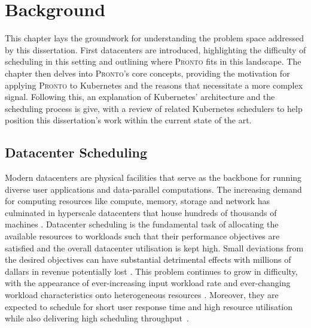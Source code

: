 \chapter{Background}

%
%
This chapter lays the groundwork for understanding the problem space addressed
by this dissertation. First datacenters are introduced, highlighting the
difficulty of scheduling in this setting and outlining where \textsc{Pronto}
fits in this landscape. The chapter then delves into \textsc{Pronto}'s core
concepts, providing the motivation for applying \textsc{Pronto} to Kubernetes
and the reasons that necessitate a more complex signal. Following this, an
explanation of Kubernetes' architecture and the scheduling process is give, with
a review of related Kubernetes schedulers to help position this dissertation's
work within the current state of the art.

\section{Datacenter Scheduling}
Modern datacenters are physical facilities that serve as the backbone for
running diverse user applications and data-parallel computations. The increasing
demand for computing resources like compute, memory, storage and network has
culminated in hyperscale datacenters that house hundreds of
thousands of machines \cite{27, 107}. Datacenter scheduling is the fundamental
task of allocating the available resources to workloads such that their
performance objectives are satisfied and the overall datacenter utilisation is
kept high. Small deviations from the desired objectives can have substantial
detrimental effects with millions of dallars in revenue potentially lost
\cite{pronto}. This problem continues to grow in difficulty, with the
appearance of ever-increasing input workload rate and ever-changing workload
characteristics onto heterogeneous resources \cite{36, 115}. Moreover, they are
expected to schedule for short user response time and high resource utilisation
while also delivering high scheduling throughput~\cite{27,36,90,107,115}.

